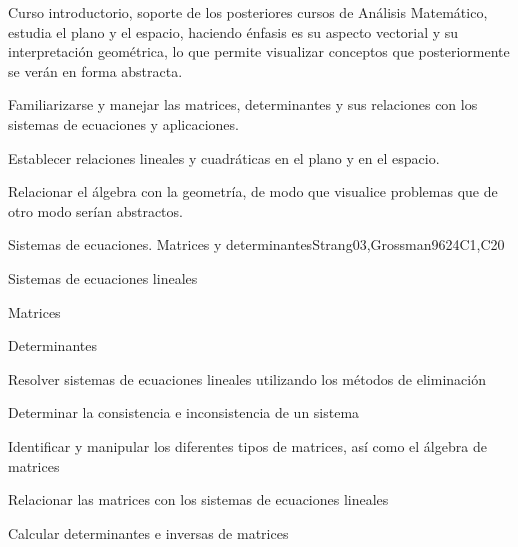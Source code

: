 \begin{syllabus}


\begin{justification}
Curso introductorio, soporte de los posteriores cursos de Análisis Matemático, 
estudia el plano y el espacio, haciendo énfasis es su aspecto vectorial y su interpretación geométrica, 
lo que permite visualizar conceptos que posteriormente se verán en forma abstracta.
\end{justification}

\begin{goals}
\item Familiarizarse y manejar las matrices, determinantes y sus relaciones con los sistemas de ecuaciones y aplicaciones.
\item Establecer relaciones lineales y cuadráticas en el plano y en el espacio.
\item Relacionar el álgebra con la geometría, de modo que visualice problemas que de otro modo serían abstractos.
\end{goals}

\begin{outcomes} 
    \item {}  
    \item {}
\end{outcomes}

\begin{competences}  
    \item {}
    \item {}
\end{competences}

\begin{unit}{}{Sistemas de ecuaciones. Matrices y determinantes}{Strang03,Grossman96}{24}{C1,C20}
   \begin{topics}
      \item Sistemas de ecuaciones lineales
      \item Matrices
      \item Determinantes
      \end{topics}

   \begin{learningoutcomes}
      \item Resolver sistemas de ecuaciones lineales utilizando los métodos de eliminación
      \item Determinar la consistencia e inconsistencia de un sistema
      \item Identificar y manipular los diferentes tipos de matrices, así como el álgebra de matrices
      \item Relacionar las matrices con los sistemas de ecuaciones lineales
      \item Calcular determinantes e inversas de matrices
   \end{learningoutcomes}
\end{unit}


\end{syllabus}
